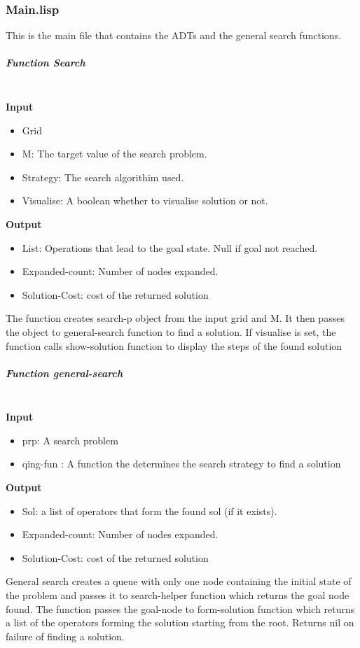 \documentclass[paper=a4, fontsize=11pt]{scrartcl}
\numberwithin{equation}{section}		%
\numberwithin{figure}{section}			%
\numberwithin{table}{section}				%
\begin{document}
\subsubsection{Main.lisp}
This is the main file that contains the ADTs and the general search functions.

\subparagraph{Function Search } \mbox{} \\
\noindent\textbf{Input}
\begin{itemize}
    \item Grid
    \item M: The target value of the search problem.
    \item Strategy: The search algorithim used.
    \item Visualise: A boolean whether to visualise solution or not.
\end{itemize}
\noindent\textbf{Output}
\begin{itemize}
    \item List: Operations that lead to the goal state. Null if goal not reached.
    \item Expanded-count: Number of nodes expanded.
    \item Solution-Cost: cost of the returned solution
\end{itemize}
The function creates search-p object from the input grid and M. It then passes the object to general-search function to find a solution. If visualise is set, the function calls show-solution function to display the steps of the found solution

\subparagraph{Function general-search } \mbox{} \\
\noindent\textbf{Input}
\begin{itemize}
    \item prp: A search problem
    \item qing-fun : A function the determines the search strategy to find a solution
\end{itemize}
\noindent\textbf{Output}
\begin{itemize}
    \item Sol: a list of operators that form the found sol (if it exists).
    \item Expanded-count: Number of nodes expanded.
    \item Solution-Cost: cost of the returned solution
\end{itemize}
General search creates a queue with only one node containing the initial state of the problem and passes it to search-helper function which returns the goal node found. The function passes the goal-node to form-solution function which returns a list of the operators forming the solution starting from the root. Returns nil on failure of finding a solution.
\end{document}
